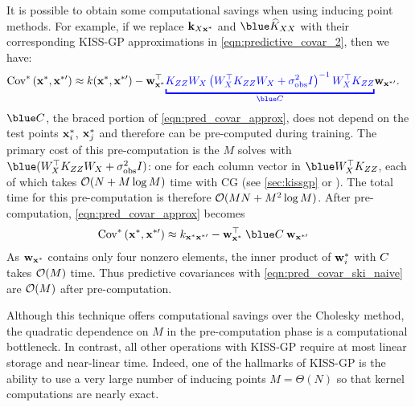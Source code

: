 It is possible to obtain some computational savings when using inducing point methods.
For example, if we replace $\mathbf{k}_{X \mathbf{x}^*}$ and $\blue \trainK$ with their corresponding KISS-GP approximations in \cref{eqn:predictive_covar_2}, then we have:
%
\begin{align}
  \covtest{\bxtest}{\bxtestprime}
  &\approx
  k(\bxtest, \bxtestprime) -
  \bw_{\bxtest}^{\top} {\color{blue}\underbracket{{\bK_{\bZ\bZ} \bW_{\bX} \left( \bW^\top_{\bX} \bK_{\bZ\bZ} \bW_\bX + \sigma^2_\text{obs} \bI \right)^{-1} \bW^\top_{\bX} \bK_{\bZ \bZ}}}_{\blue \bC}} \bw_{\bxtestprime}.
  \label{eqn:pred_covar_approx}
\end{align}
%
$\blue \bC$, the braced portion of \cref{eqn:pred_covar_approx}, does not depend on the test points $\mathbf{x}^*_{i}$, $\mathbf{x}^*_{j}$ and therefore can be pre-computed during training.
The primary cost of this pre-computation is the $M$ solves with $\blue (\bW_\bX^\top {\bK}_{\bZ\bZ} \bW_\bX + \sigma_\text{obs}^2 \bI)$: one for each column vector in $\blue \bW^{\top}_{\bX} \bK_{\bZ\bZ}$, each of which takes $\bigo{N + M\log M}$ time with CG (see \cref{sec:kissgp} or \citet{wilson2015kernel}).
The total time for this pre-computation is therefore $\bigo{MN + M^2 \log M}$.
After pre-computation, \cref{eqn:pred_covar_approx} becomes
%
\begin{align}
  \covtest{\bxtest}{\bxtestprime} &\approx k_{\bxtest \bxtestprime} - \bw_{\bxtest}^\top \: {\blue \bC} \: \bw_{\bxtestprime}
    \label{eqn:pred_covar_ski_naive}
\end{align}
As $\mathbf{w}_{\mathbf{x}^*}$ contains only four nonzero elements, the inner product of $\mathbf{w}^{*}_{i}$ with $C$ takes $\bigo{M}$ time.
Thus predictive covariances with \cref{eqn:pred_covar_ski_naive} are $\bigo{M}$ after pre-computation.

Although this technique offers computational savings over the Cholesky method, the quadratic dependence on $M$ in the pre-computation phase is a computational bottleneck.
In contrast, all other operations with KISS-GP require at most linear storage and near-linear time.
Indeed, one of the hallmarks of KISS-GP is the ability to use a very large number of inducing points $M = \Theta(N)$ so that kernel computations are nearly exact.

